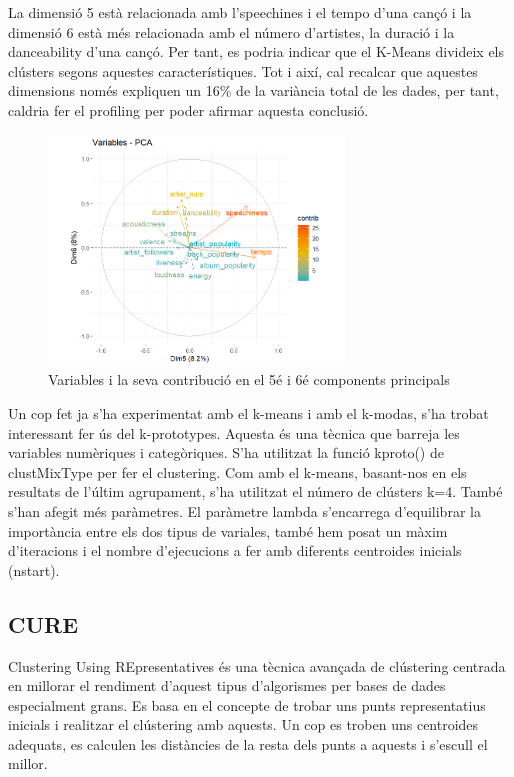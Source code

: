 \documentclass{article}
\begin{document}
La dimensió 5 està relacionada amb l'speechines i el tempo d'una cançó i la dimensió 6 està més relacionada amb el número d'artistes, la duració i la danceability d'una cançó. Per tant, es podria indicar que el K-Means divideix els clústers segons aquestes característiques. Tot i així, cal recalcar que aquestes dimensions només expliquen un 16\% de la variància total de les dades, per tant, caldria fer el profiling per poder afirmar aquesta conclusió.

\begin{figure}[H]
    \centering
    \includegraphics[width=0.7\textwidth]{Images/4_clustering/KMODES/kmodes2.png}
    \caption{Variables i la seva contribució en el 5é i 6é components principals}
    \label{fig:kmodes2}
\end{figure}

Un cop fet ja s'ha experimentat amb el k-means i amb el k-modas, s'ha trobat interessant  fer ús del k-prototypes. Aquesta és una tècnica que barreja les variables numèriques i categòriques. S'ha utilitzat la funció kproto() de clustMixType per fer el clustering. Com amb el k-means, basant-nos en els resultats de l'últim agrupament, s'ha utilitzat el número de clústers k=4. També s'han afegit més paràmetres. El paràmetre lambda s'encarrega d'equilibrar la importància entre els dos tipus de variales, també hem posat un màxim d'iteracions i el nombre d'ejecucions a fer amb diferents centroides inicials (nstart). 

\subsection{CURE}
Clustering Using REpresentatives és una tècnica avançada de clústering centrada en millorar el rendiment d’aquest tipus d’algorismes per bases de dades especialment grans. Es basa en el concepte de trobar uns punts representatius inicials i realitzar el clústering amb aquests. Un cop es troben uns centroides adequats, es calculen les distàncies de la resta dels punts a aquests i s’escull el millor.
\end{document}

